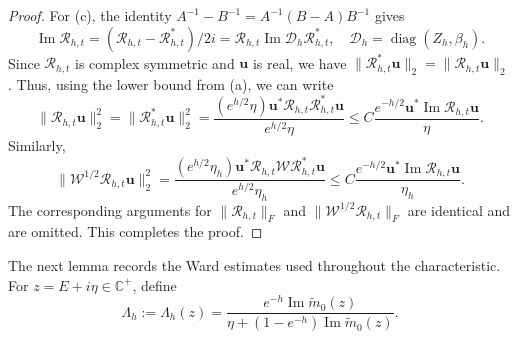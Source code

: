 \documentclass[11pt,reqno]{amsart}
\def\u{\mathbf{u}}
\def\C{\mathbb{C}}
\def\cR{\mathcal{R}}
\def\cW{\mathcal{W}}
\def\cD{\mathcal{D}}
\def\Im{\operatorname{Im}}
\def\diag{\operatorname{diag}}
\theoremstyle{definition}
\numberwithin{equation}{section}
\numberwithin{figure}{section}
\begin{document}
\begin{proof}
For (c), the identity $A^{-1}-B^{-1}=A^{-1}(B-A)B^{-1}$ gives
\[
    \Im\cR_{h,t}=(\cR_{h,t}-\cR_{h,t}^*)/2i=\cR_{h,t}\Im\cD_h\cR_{h,t}^*,\quad \cD_h=\diag(Z_{h},\beta_{h}).
\]
Since $\cR_{h,t}$ is complex symmetric and $\u$ is real, we have $\|\cR_{h,t}^*\u\|_2=\|\cR_{h,t}\u\|_2$. Thus, using the lower bound from (a), we can write
\[
    \|\cR_{h,t}\u\|_2^2=\|\cR_{h,t}^*\u\|_2^2=\frac{(e^{h/2}\eta)\u^*\cR_{h,t}\cR_{h,t}^*\u}{e^{h/2}\eta}\leq C\frac{e^{-h/2}\u^*\Im\cR_{h,t}\u}{\eta}.
\]
Similarly,
\[
    \|\cW^{1/2}\cR_{h,t}\u\|_2^2=\frac{(e^{h/2}\eta_h)\u^*\cR_{h,t}\cW\cR_{h,t}^*\u}{e^{h/2}\eta_h}\leq C\frac{e^{-h/2}\u^*\Im\cR_{h,t}\u}{\eta_h}.
\]
The corresponding arguments for $\|\cR_{h,t}\|_F$ and $\|\cW^{1/2}\cR_{h,t}\|_F$ are identical and are omitted. This completes the proof.
\end{proof}

The next lemma records the Ward estimates used throughout the characteristic. For $z=E+i\eta\in\C^+$, define 
\[
    \Lambda_h:=\Lambda_h(z)=\frac{e^{-h}\Im\widetilde m_0(z)}{\eta+(1-e^{-h})\Im\widetilde m_0(z)}.
\]
\end{document}
